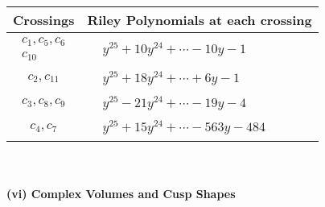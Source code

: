 \documentclass[1p]{elsarticle_modified}
\theoremstyle{definition}
\begin{document}
\begin{tabular}{m{50pt}|m{274pt}}
Crossings & \hspace{64pt}Riley Polynomials at each crossing \\
\hline $$\begin{aligned}c_{1},c_{5},c_{6}\\c_{10}\end{aligned}$$&$\begin{aligned}
&y^{25}+10 y^{24}+\cdots-10 y-1
\end{aligned}$\\
\hline $$\begin{aligned}c_{2},c_{11}\end{aligned}$$&$\begin{aligned}
&y^{25}+18 y^{24}+\cdots+6 y-1
\end{aligned}$\\
\hline $$\begin{aligned}c_{3},c_{8},c_{9}\end{aligned}$$&$\begin{aligned}
&y^{25}-21 y^{24}+\cdots-19 y-4
\end{aligned}$\\
\hline $$\begin{aligned}c_{4},c_{7}\end{aligned}$$&$\begin{aligned}
&y^{25}+15 y^{24}+\cdots-563 y-484
\end{aligned}$\\
\hline
\end{tabular}\\~\\
\newpage\flushleft \textbf{(vi) Complex Volumes and Cusp Shapes}
\end{document}
